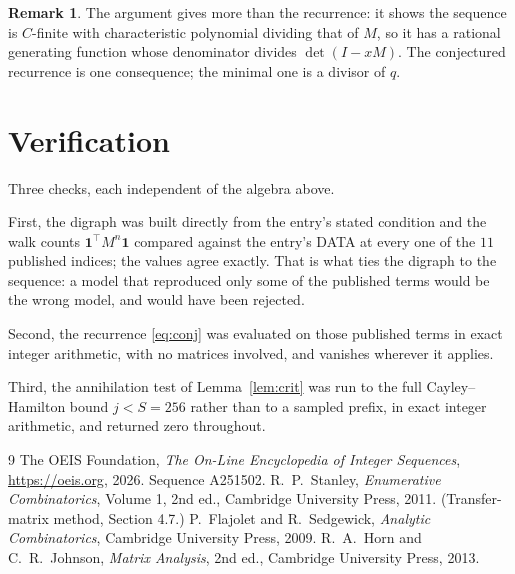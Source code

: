\documentclass[11pt,a4paper]{article}
\theoremstyle{plain}
\theoremstyle{definition}
\newtheorem{remark}[theorem]{Remark}
\begin{document}
\begin{remark}
The argument gives more than the recurrence: it shows the sequence is $C$-finite with
characteristic polynomial dividing that of $M$, so it has a rational generating function
whose denominator divides $\det(I-xM)$. The conjectured recurrence is one consequence; the
minimal one is a divisor of $q$.
\end{remark}

\section{Verification}

Three checks, each independent of the algebra above.

First, the digraph was built directly from the entry's stated condition and the walk counts
$\mathbf{1}^{\!\top}M^{n}\mathbf{1}$ compared against the entry's DATA at every one of
the $11$ published indices; the values agree exactly. That is what ties the digraph to
the sequence: a model that reproduced only some of the published terms would be the wrong
model, and would have been rejected.

Second, the recurrence \eqref{eq:conj} was evaluated on those published terms in exact
integer arithmetic, with no matrices involved, and vanishes wherever it applies.

Third, the annihilation test of Lemma~\ref{lem:crit} was run to the full Cayley--Hamilton
bound $j<S=256$ rather than to a sampled prefix, in exact integer arithmetic, and returned
zero throughout.

\begin{thebibliography}{9}
 The OEIS Foundation, \emph{The On-Line Encyclopedia of Integer
Sequences}, \url{https://oeis.org}, 2026. Sequence A251502.
 R.~P.~Stanley, \emph{Enumerative Combinatorics}, Volume 1, 2nd ed.,
Cambridge University Press, 2011. (Transfer-matrix method, Section 4.7.)
 P.~Flajolet and R.~Sedgewick, \emph{Analytic Combinatorics}, Cambridge
University Press, 2009.
 R.~A.~Horn and C.~R.~Johnson, \emph{Matrix Analysis}, 2nd ed., Cambridge
University Press, 2013.
\end{thebibliography}
\end{document}
